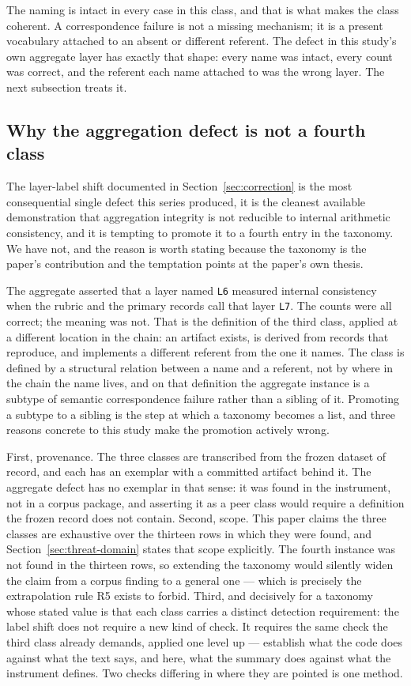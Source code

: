 \documentclass[sigconf,review]{acmart}
\begin{document}
The naming is intact in every case in this class, and that is what makes the
class coherent. A correspondence failure is not a missing mechanism; it is a
present vocabulary attached to an absent or different referent. The defect in
this study's own aggregate layer has exactly that shape: every name was intact,
every count was correct, and the referent each name attached to was the wrong
layer. The next subsection treats it.

\subsection{Why the aggregation defect is not a fourth class}
\label{sec:tax-apparatus}

The layer-label shift documented in Section~\ref{sec:correction} is the most
consequential single defect this series produced, it is the cleanest available
demonstration that aggregation integrity is not reducible to internal
arithmetic consistency, and it is tempting to promote it to a fourth entry in
the taxonomy. We have not, and the reason is worth stating because the
taxonomy is the paper's contribution and the temptation points at the paper's
own thesis.

The aggregate asserted that a layer named \texttt{L6} measured internal
consistency when the rubric and the primary records call that layer
\texttt{L7}. The counts were all correct; the meaning was not. That is the
definition of the third class, applied at a different location in the chain:
an artifact exists, is derived from records that reproduce, and implements a
different referent from the one it names. The class is defined by a structural
relation between a name and a referent, not by where in the chain the name
lives, and on that definition the aggregate instance is a subtype of semantic
correspondence failure rather than a sibling of it. Promoting a subtype to a
sibling is the step at which a taxonomy becomes a list, and three reasons
concrete to this study make the promotion actively wrong.

First, provenance. The three classes are transcribed from the frozen dataset
of record, and each has an exemplar with a committed artifact behind it. The
aggregate defect has no exemplar in that sense: it was found in the
instrument, not in a corpus package, and asserting it as a peer class would
require a definition the frozen record does not contain. Second, scope. This
paper claims the three classes are exhaustive over the thirteen rows in which
they were found, and Section~\ref{sec:threat-domain} states that scope
explicitly. The fourth instance was not found in the thirteen rows, so
extending the taxonomy would silently widen the claim from a corpus finding to
a general one --- which is precisely the extrapolation rule R5 exists to
forbid. Third, and decisively for a taxonomy whose stated value is that each
class carries a distinct detection requirement: the label shift does not
require a new kind of check. It requires the same check the third class
already demands, applied one level up --- establish what the code does against
what the text says, and here, what the summary does against what the instrument
defines. Two checks differing in where they are pointed is one method.
\end{document}
